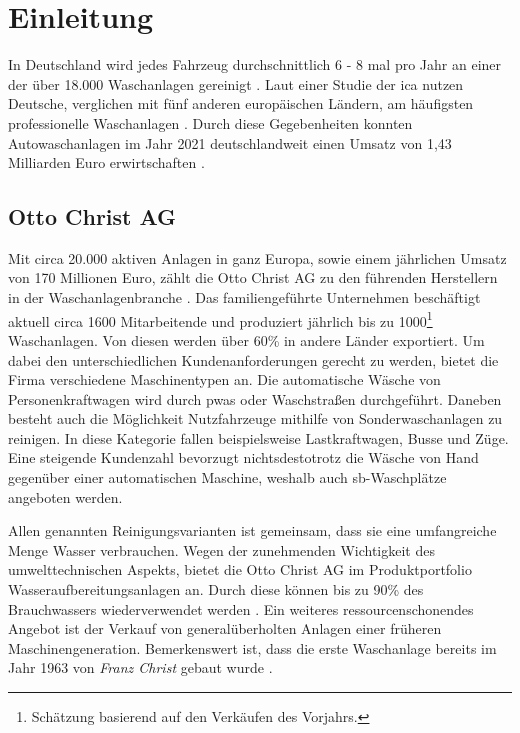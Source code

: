 \chapter{Einleitung}
In Deutschland wird jedes Fahrzeug durchschnittlich 6 - 8 mal pro Jahr an einer der über 18.000 Waschanlagen gereinigt \cite{carwashpro}. Laut einer Studie der \ac{ica} nutzen Deutsche, verglichen mit fünf anderen europäischen Ländern, am häufigsten professionelle Waschanlagen \cite{ica}. 
Durch diese Gegebenheiten konnten Autowaschanlagen im Jahr 2021 deutschlandweit einen Umsatz von 1,43 Milliarden Euro erwirtschaften \cite{statista_umsatz}. 

\section{Otto Christ AG}
Mit circa 20.000 aktiven Anlagen in ganz Europa, sowie einem jährlichen Umsatz von 170 Millionen Euro, zählt die Otto Christ AG zu den führenden Herstellern in der Waschanlagenbranche \cite{christ}. Das familiengeführte Unternehmen beschäftigt aktuell circa 1600 Mitarbeitende und produziert jährlich bis zu 1000\footnote{Schätzung basierend auf den Verkäufen des Vorjahrs.} Waschanlagen. Von diesen werden über 60\% in andere Länder exportiert.
Um dabei den unterschiedlichen Kundenanforderungen gerecht zu werden, bietet die Firma verschiedene Maschinentypen an. Die automatische Wäsche von Personenkraftwagen wird durch \acp{pwa} oder Waschstraßen durchgeführt. Daneben besteht auch die Möglichkeit Nutzfahrzeuge mithilfe von Sonderwaschanlagen zu reinigen. In diese Kategorie fallen beispielsweise Lastkraftwagen, Busse und Züge. Eine steigende Kundenzahl bevorzugt nichtsdestotrotz die Wäsche von Hand gegenüber einer automatischen Maschine, weshalb auch \ac{sb}-Waschplätze angeboten werden.

Allen genannten Reinigungsvarianten ist gemeinsam, dass sie eine umfangreiche Menge Wasser verbrauchen. Wegen der zunehmenden Wichtigkeit des umwelttechnischen Aspekts, bietet die Otto Christ AG im Produktportfolio Wasseraufbereitungsanlagen an. Durch diese können bis zu 90\% des Brauchwassers wiederverwendet werden \cite{christ}. Ein weiteres ressourcenschonendes Angebot ist der Verkauf von generalüberholten Anlagen einer früheren Maschinengeneration. Bemerkenswert ist, dass die erste Waschanlage bereits im Jahr 1963 von \textit{Franz Christ} gebaut wurde \cite{christ}.

\newpage

